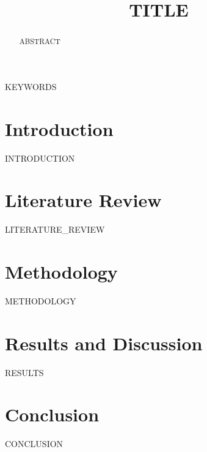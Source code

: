 \documentclass[conference]{IEEEtran}
\begin{document}
\title{{{TITLE}}}

\author{
}

\maketitle

\begin{abstract}
{{ABSTRACT}}
\end{abstract}

\begin{IEEEkeywords}
{{KEYWORDS}}
\end{IEEEkeywords}

\section{Introduction}
{{INTRODUCTION}}

\section{Literature Review}
{{LITERATURE_REVIEW}}

\section{Methodology}
{{METHODOLOGY}}

\section{Results and Discussion}
{{RESULTS}}

\section{Conclusion}
{{CONCLUSION}}



\end{document}
